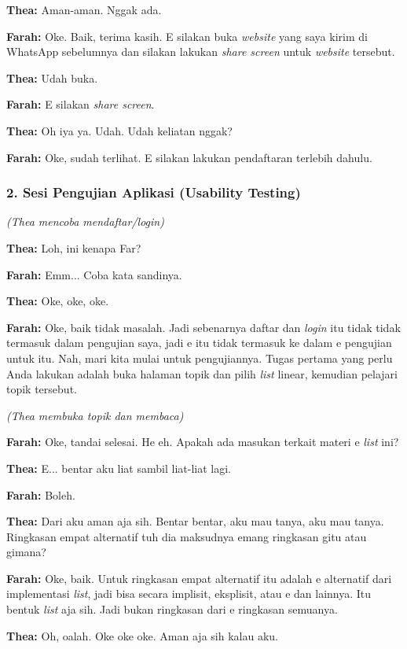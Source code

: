 \textbf{Thea:} Aman-aman. Nggak ada.

\textbf{Farah:} Oke. Baik, terima kasih. E silakan buka \textit{website} yang saya kirim di WhatsApp sebelumnya dan silakan lakukan \textit{share screen} untuk \textit{website} tersebut.

\textbf{Thea:} Udah buka.

\textbf{Farah:} E silakan \textit{share screen}.

\textbf{Thea:} Oh iya ya. Udah. Udah keliatan nggak?

\textbf{Farah:} Oke, sudah terlihat. E silakan lakukan pendaftaran terlebih dahulu.

\bigskip

\subsubsection*{2. Sesi Pengujian Aplikasi (Usability Testing)}

\textit{(Thea mencoba mendaftar/login)}

\textbf{Thea:} Loh, ini kenapa Far?

\textbf{Farah:} Emm... Coba kata sandinya.

\textbf{Thea:} Oke, oke, oke.

\textbf{Farah:} Oke, baik tidak masalah. Jadi sebenarnya daftar dan \textit{login} itu tidak tidak termasuk dalam pengujian saya, jadi e itu tidak termasuk ke dalam e pengujian untuk itu. Nah, mari kita mulai untuk pengujiannya. Tugas pertama yang perlu Anda lakukan adalah buka halaman topik dan pilih \textit{list} linear, kemudian pelajari topik tersebut.

\textit{(Thea membuka topik dan membaca)}

\textbf{Farah:} Oke, tandai selesai. He eh. Apakah ada masukan terkait materi e \textit{list} ini?

\textbf{Thea:} E... bentar aku liat sambil liat-liat lagi.

\textbf{Farah:} Boleh.

\textbf{Thea:} Dari aku aman aja sih. Bentar bentar, aku mau tanya, aku mau tanya. Ringkasan empat alternatif tuh dia maksudnya emang ringkasan gitu atau gimana?

\textbf{Farah:} Oke, baik. Untuk ringkasan empat alternatif itu adalah e alternatif dari implementasi \textit{list}, jadi bisa secara implisit, eksplisit, atau e dan lainnya. Itu bentuk \textit{list} aja sih. Jadi bukan ringkasan dari e ringkasan semuanya.

\textbf{Thea:} Oh, oalah. Oke oke oke. Aman aja sih kalau aku.

